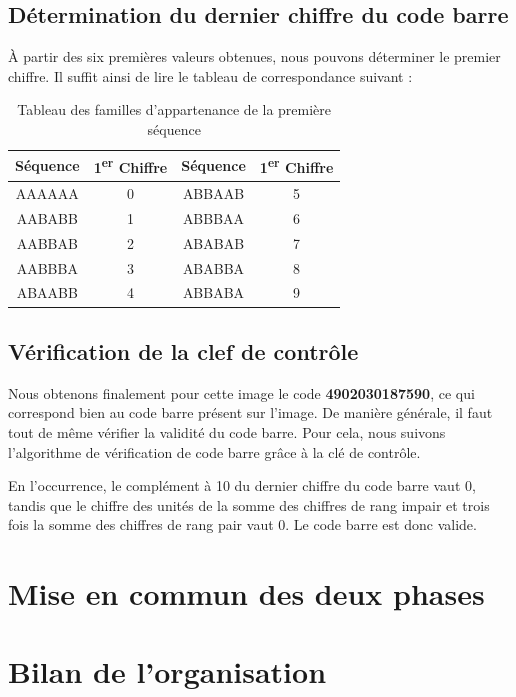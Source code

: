 \documentclass{rapport}
\begin{document}
\subsection{Détermination du dernier chiffre du code barre}
À partir des six premières valeurs obtenues, nous pouvons déterminer le premier chiffre. 
Il suffit ainsi de lire le tableau de correspondance suivant :

\begin{table}[h!]
    \centering
    \renewcommand{\arraystretch}{1.5} %
    \begin{tabular}{|c|c|c|c|}
        \hline
        \textbf{Séquence} & \textbf{1\textsuperscript{er} Chiffre} & \textbf{Séquence} & \textbf{1\textsuperscript{er} Chiffre} \\ \hline
        AAAAAA & 0 & ABBAAB & 5 \\ \hline
        AABABB & 1 & ABBBAA & 6 \\ \hline
        AABBAB & 2 & ABABAB & 7 \\ \hline
        AABBBA & 3 & ABABBA & 8 \\ \hline
        ABAABB & 4 & ABBABA & 9 \\ \hline
    \end{tabular}
    \caption{Tableau des familles d’appartenance de la première séquence}
    \label{tab:sequence}
\end{table}

\subsection{Vérification de la clef de contrôle}
Nous obtenons finalement pour cette image le code \textbf{4902030187590}, ce qui correspond bien au code barre présent sur l'image.
De manière générale, il faut tout de même vérifier la validité du code barre. Pour cela, nous suivons l'algorithme de vérification de code barre grâce à la clé de contrôle.

En l'occurrence, le complément à 10 du dernier chiffre du code barre vaut 0, tandis que le chiffre des unités de la somme des chiffres de rang impair et trois fois la somme des chiffres de rang pair vaut 0. 
Le code barre est donc valide.

\section{Mise en commun des deux phases}

\section{Bilan de l'organisation}
\end{document}
